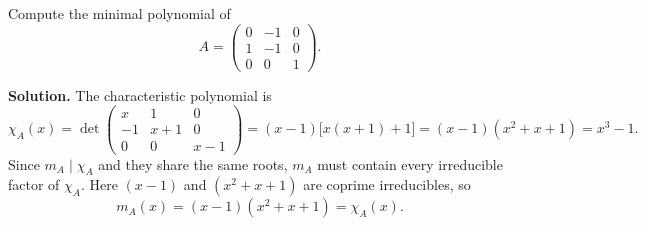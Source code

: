 \begin{exbox}
Compute the minimal polynomial of
\[
  A = \begin{pmatrix} 0 & -1 & 0 \\ 1 & -1 & 0 \\ 0 & 0 & 1 \end{pmatrix}.
\]

\textbf{Solution.} The characteristic polynomial is
\[
  \chi_A(x)
  = \det\begin{pmatrix} x & 1 & 0 \\ -1 & x+1 & 0 \\ 0 & 0 & x-1 \end{pmatrix}
  = (x-1)\bigl[x(x+1)+1\bigr]
  = (x-1)(x^2+x+1)
  = x^3-1.
\]
Since $m_A \mid \chi_A$ and they share the same roots, $m_A$ must contain every
irreducible factor of $\chi_A$.  Here $(x-1)$ and $(x^2+x+1)$ are coprime
irreducibles, so
\[
  m_A(x) = (x-1)(x^2+x+1) = \chi_A(x).
\]
\end{exbox}

